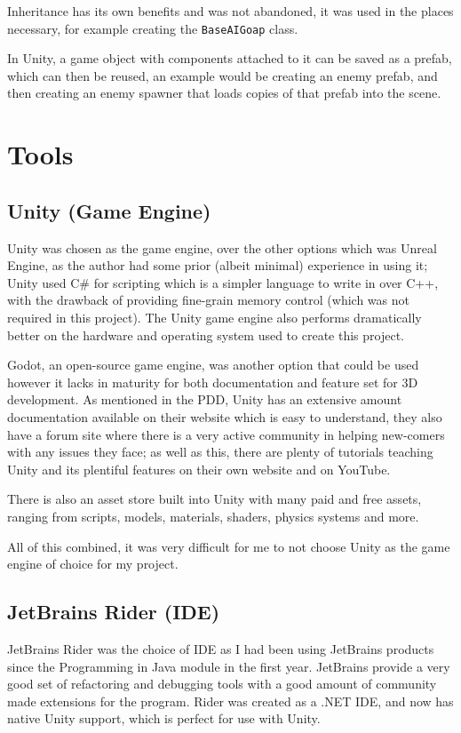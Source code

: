\documentclass[11pt]{report}
\begin{document}
Inheritance has its own benefits and was not abandoned, it was used in the places necessary, for example creating the \lstinline{BaseAIGoap} class.

In Unity, a game object with components attached to it can be saved as a prefab, which can then be reused, an example would be creating an enemy prefab, and then creating an enemy spawner that loads copies of that prefab into the scene.

\section{Tools}

\subsection{Unity (Game Engine)}
Unity\cite{unity} was chosen as the game engine, over the other options which was Unreal Engine\cite{unrealEngine}, as the author had some prior (albeit minimal) experience in using it; Unity used C\# for scripting which is a simpler language to write in over C++, with the drawback of providing fine-grain memory control (which was not required in this project). The Unity game engine also performs dramatically better on the hardware and operating system used to create this project.

Godot, an open-source game engine, was another option that could be used however it lacks in maturity for both documentation and feature set for 3D development\cite{godot}. As mentioned in the PDD, Unity has an extensive amount documentation available on their website which is easy to understand, they also have a forum site where there is a very active community in helping new-comers with any issues they face; as well as this, there are plenty of tutorials teaching Unity and its plentiful features on their own website and on YouTube.

There is also an asset store built into Unity with many paid and free assets, ranging from scripts, models, materials, shaders, physics systems and more.

All of this combined, it was very difficult for me to not choose Unity as the game engine of choice for my project.

\subsection{JetBrains Rider (IDE)}
JetBrains Rider was the choice of IDE as I had been using JetBrains products since the Programming in Java module in the first year. JetBrains provide a very good set of refactoring and debugging tools with a good amount of community made extensions for the program. Rider was created as a .NET IDE, and now has native Unity support, which is perfect for use with Unity.
\end{document}
